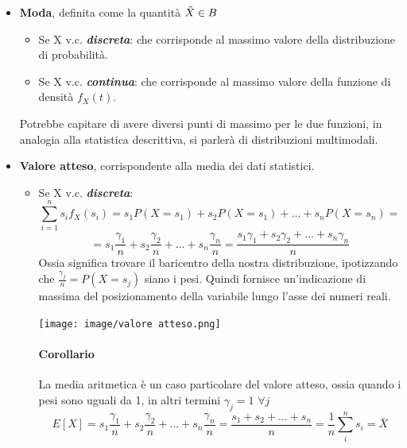 \documentclass{article}
\begin{document}
                 \begin{itemize}
                 
                    \item \textbf{Moda}, definita come la quantità $\Tilde{X}\in B$ 
                        \begin{itemize}
                            \item Se X v.c. \textbf{\textit{discreta}}:  
                                che corrisponde al massimo valore della distribuzione di probabilità. 
                            \item Se X v.c. \textbf{\textit{continua}}:
                              che corrisponde al massimo valore della funzione di densità $f_X(t)$.
                        \end{itemize}
                          Potrebbe capitare di avere diversi punti di massimo per le due funzioni, in analogia alla statistica descrittiva, si parlerà di distribuzioni multimodali. 
                            
                     \item \textbf{Valore atteso}, corrispondente alla media dei dati statistici.
                        \begin{itemize}
                            \item Se X v.c. \textbf{\textit{discreta}}:  
                            $$
                                \sum_{i=1}^{n} s_i f_X(s_i)= s_1P(X=s_1)+ s_2P(X=s_1)+...+ s_nP(X=s_n)=
                             $$
                             $$
                                =s_1\frac{\gamma_1}{n}+s_2\frac{\gamma_2}{n}+...+s_n\frac{\gamma_n}{n}=\frac{s_1\gamma_1+s_2\gamma_2+...+s_n\gamma_n}{n}
                             $$
                             Ossia significa trovare il baricentro della nostra distribuzione, ipotizzando che $\frac{\gamma_j}{n} = P(X=s_j)$ siano i pesi.  Quindi fornisce un’indicazione di massima del posizionamento della variabile lungo l’asse dei numeri reali.
                               \begin{center}
                                       \texttt{[image: image/valore atteso.png]}
                               \end{center}
                               
                               \paragraph{Corollario}La media aritmetica è un caso particolare del valore atteso, ossia quando i pesi sono uguali da 1, in altri termini  $\gamma_j = 1\,\, \forall j$
                               $$
                                    E[X]= s_1\frac{\gamma_1}{n}+s_2\frac{\gamma_2}{n}+...+s_n\frac{\gamma_n}{n}= \frac{s_1+s_2+...+s_n}{n}= \frac{1}{n}\sum_i^n s_i = \bar{X}
                                $$
                                

\end{itemize}
\end{itemize}
\end{document}
